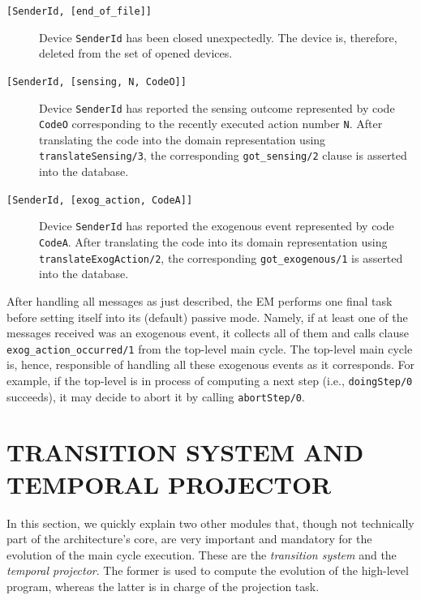 \documentclass[11pt]{article}
\begin{document}
\begin{description}
  
\item[ \texttt{[SenderId, [end\_of\_file]]} ] Device \texttt{SenderId} has been
closed unexpectedly. The device is, therefore, deleted from the set of opened
devices.
  
\item[ \texttt{[SenderId, [sensing, N, CodeO]]} ] Device \texttt{SenderId} has
reported the sensing outcome represented by code \texttt{CodeO} corresponding
to the recently executed action number \texttt{N}. After translating the 
code into the domain representation using \texttt{translateSensing/3}, the
corresponding \texttt{got\_sensing/2} clause is asserted into the database.
  
\item[ \texttt{[SenderId, [exog\_action, CodeA]]} ] Device \texttt{SenderId} has
reported the exogenous event represented by code \texttt{CodeA}.  After
translating the code into its domain representation using
\texttt{translateExogAction/2}, the corresponding
\texttt{got\_exogenous/1} is asserted into the database.
\end{description}


After handling all messages as just described, the EM performs one final task
before setting itself into its (default) passive mode. Namely, if at least one
of the messages received was an exogenous event, it collects all of
them and calls clause \texttt{exog\_action\_occurred/1} from the top-level
main cycle. The top-level main cycle is, hence, responsible of handling all
these exogenous events as it corresponds. For example, if the top-level is
in process of computing a next step (i.e., \texttt{doingStep/0} succeeds), it
may decide to abort it by calling \texttt{abortStep/0}.



\section{TRANSITION SYSTEM AND TEMPORAL PROJECTOR \label{sec:eval}}

In this section, we quickly explain two other modules that, though not
technically part of the architecture's core, are very important and mandatory
for the evolution of the main cycle execution. These are the \textit{transition
system} and the \textit{temporal projector}. The former is used to compute the
evolution of the high-level program, whereas the latter is in charge of
the projection task.
\end{document}
